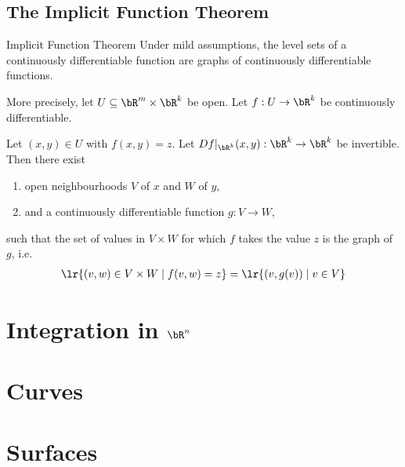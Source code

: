 \section{The Implicit Function Theorem}
\begin{importanttheorem}{Implicit Function Theorem}{}
	Under mild assumptions, the level sets of a continuously differentiable function are graphs of continuously differentiable functions.
	
	More precisely, let $U \subseteq \bR^m \times \bR^k$ be open. Let $f : U \to \bR^k$ be continuously differentiable.
	
	Let $(x,y) \in U$ with $f(x,y) = z$. Let $Df|_{\bR^k}(x,y) : \bR^k \to \bR^k$ be invertible. Then there exist
	\begin{enumerate}
		\item open neighbourhoods $V$ of $x$ and $W$ of $y$,
		\item and a continuously differentiable function $g : V \to W$,
	\end{enumerate}
	such that the set of values in $V \times W$ for which $f$ takes the value $z$ is the graph of $g$, i.e.
	\begin{align*}
		\lr{(v,w) \in V \times W \mid f(v,w) = z}
		=
		\lr{(v,g(v)) \mid v \in V}
	\end{align*}
\end{importanttheorem}
\chapter{Integration in $\bR^n$}
\chapter{Curves}
\chapter{Surfaces}
